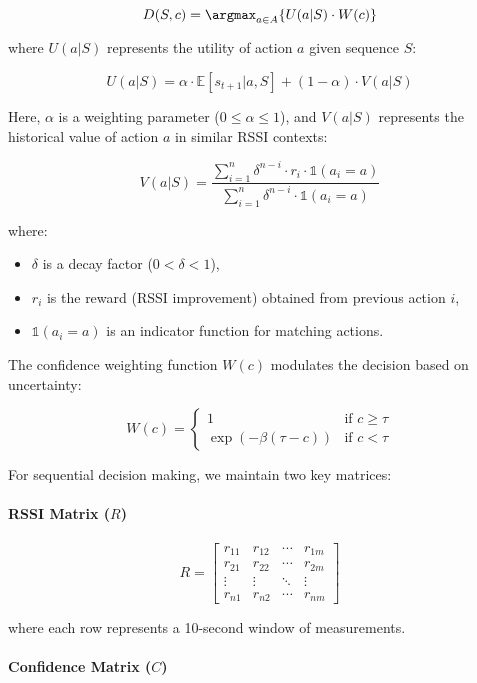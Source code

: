 \documentclass[12pt]{article}
\begin{document}
\[
D(S, c) = \argmax_{a \in A} \{U(a|S) \cdot W(c)\}
\]

where \( U(a|S) \) represents the utility of action \( a \) given sequence \( S \):

\[
U(a|S) = \alpha \cdot \mathbb{E}[s_{t+1}|a,S] + (1-\alpha) \cdot V(a|S)
\]

Here, \( \alpha \) is a weighting parameter (\( 0 \leq \alpha \leq 1 \)), and \( V(a|S) \) represents the historical value of action \( a \) in similar RSSI contexts:

\[
V(a|S) = \frac{\sum_{i=1}^n \delta^{n-i} \cdot r_i \cdot \mathbb{1}(a_i=a)}{\sum_{i=1}^n \delta^{n-i} \cdot \mathbb{1}(a_i=a)}
\]

where:
\begin{itemize}
    \item \( \delta \) is a decay factor (\( 0 < \delta < 1 \)),
    \item \( r_i \) is the reward (RSSI improvement) obtained from previous action \( i \),
    \item \( \mathbb{1}(a_i=a) \) is an indicator function for matching actions.
\end{itemize}

The confidence weighting function \( W(c) \) modulates the decision based on uncertainty:

\[
W(c) = 
\begin{cases} 
1 & \text{if } c \geq \tau \\
\exp(-\beta(\tau-c)) & \text{if } c < \tau
\end{cases}
\]

For sequential decision making, we maintain two key matrices:

\paragraph{RSSI Matrix (\( R \))}

\[
R = 
\begin{bmatrix} 
r_{11} & r_{12} & \cdots & r_{1m} \\
r_{21} & r_{22} & \cdots & r_{2m} \\
\vdots & \vdots & \ddots & \vdots \\
r_{n1} & r_{n2} & \cdots & r_{nm}
\end{bmatrix}
\]

where each row represents a 10-second window of measurements.

\paragraph{Confidence Matrix (\( C \))}
\end{document}
